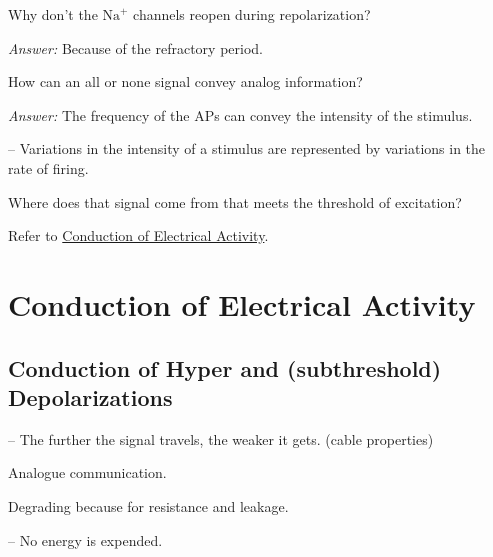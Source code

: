 \begin{coloredlist}
\begin{coloredlist}
\begin{coloredlist}
            \item Why don't the \(\text{Na}^{+}\) channels reopen during repolarization?
            \begin{coloredlist}
                \item \textit{Answer:} Because of the refractory period.
            \end{coloredlist}
            \item How can an all or none signal convey analog information?
            \begin{coloredlist}
                \item \textit{Answer:} The frequency of the APs can convey the intensity of the stimulus.
                \item {} -- Variations in the intensity of a stimulus are represented by variations in the rate of firing.
            \end{coloredlist}
            \item Where does that signal come from that meets the threshold of excitation?
            \begin{coloredlist}
                \item Refer to \hyperlink{sec:electrical activity}{Conduction of Electrical Activity}.
            \end{coloredlist}
        \end{coloredlist}
    \end{coloredlist}
\end{coloredlist}

\hypertarget{sec:electrical activity}{}
\section{Conduction of Electrical Activity}

\subsection{Conduction of Hyper and (subthreshold) Depolarizations}

\begin{coloredlist}
    \item {} -- The further the signal travels, the weaker it gets. (cable properties)
    \begin{coloredlist}
        \item Analogue communication.
        \begin{coloredlist}
            \item Degrading because for resistance and leakage.
        \end{coloredlist}
        \item {} -- No energy is expended.
    \end{coloredlist}
\end{coloredlist}

